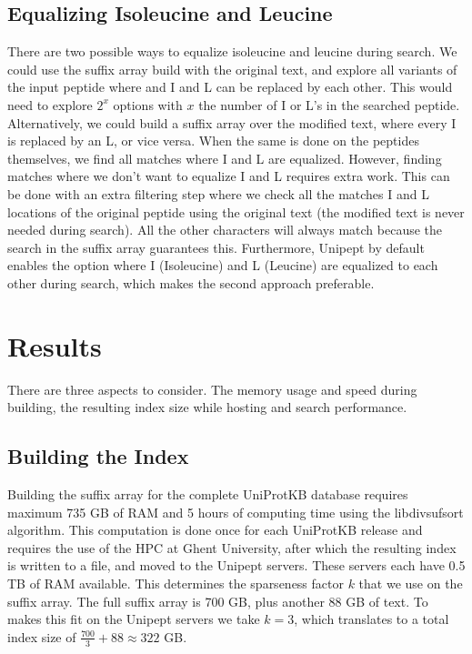 \documentclass[11pt]{article}
\begin{document}
\begin{multicols}{2}
        \subsection{Equalizing Isoleucine and Leucine}
        There are two possible ways to equalize isoleucine and leucine during search.
        We could use the suffix array build with the original text, and explore all variants of the input peptide where and I and L can be replaced by each other.
        This would need to explore $2^x$ options with $x$ the number of I or L's in the searched peptide.
        Alternatively, we could build a suffix array over the modified text, where every I is replaced by an L, or vice versa.
        When the same is done on the peptides themselves, we find all matches where I and L are equalized.
        However, finding matches where we don't want to equalize I and L requires extra work.
        This can be done with an extra filtering step where we check all the matches I and L locations of the original peptide using the original text (the modified text is never needed during search).
        All the other characters will always match because the search in the suffix array guarantees this.
        Furthermore, Unipept by default enables the option where I (Isoleucine) and L (Leucine) are equalized to each other during search, which makes the second approach preferable.


        \section{Results}\label{sec:results}
        There are three aspects to consider.
        The memory usage and speed during building, the resulting index size while hosting and search performance.

        \subsection{Building the Index}
        Building the suffix array for the complete UniProtKB database requires maximum 735 GB of RAM and 5 hours of computing time using the libdivsufsort algorithm.
        This computation is done once for each UniProtKB release and requires the use of the HPC at Ghent University, after which the resulting index is written to a file, and moved to the Unipept servers.
        These servers each have 0.5 TB of RAM available.
        This determines the sparseness factor $k$ that we use on the suffix array.
        The full suffix array is 700 GB, plus another 88 GB of text.
        To makes this fit on the Unipept servers we take $k = 3$, which translates to a total index size of $\frac{700}{3} + 88 \approx 322$ GB\@.


\end{multicols}
\end{document}
